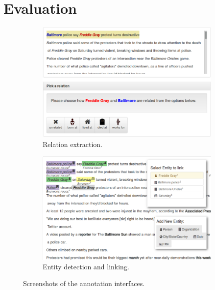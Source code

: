 \section{Evaluation}
\label{sec:evaluation}

\begin{figure}[h]
\begin{subfigure}{0.49\textwidth}
  \includegraphics[width=\textwidth]{figures/interface/relation-interface}
  \caption{\label{fig:relation-interface} Relation extraction.}
\end{subfigure}
\hfill
\begin{subfigure}{0.49\textwidth}
  \includegraphics[width=\textwidth]{figures/interface/extraction-interface}
  \caption{\label{fig:entity-interface} Entity detection and linking.}
\end{subfigure}
\caption{\label{fig:interfaces} Screenshots of the annotation interfaces.}
\end{figure}

